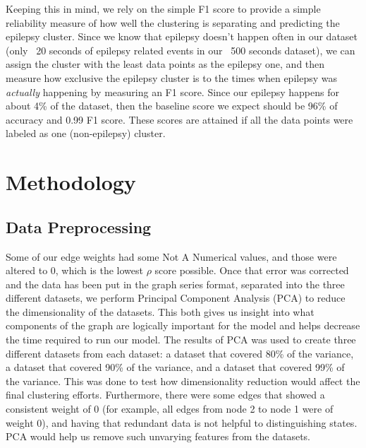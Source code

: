 \documentclass[journal,12pt,onecolumn,draftclsnofoot]{IEEEtran}  %
\begin{document}
Keeping this in mind, we rely on the simple F1 score to provide a simple reliability measure of how well the clustering is separating and predicting the epilepsy cluster. Since we know that epilepsy doesn't happen often in our dataset (only ~20 seconds  of epilepsy related events in our ~500 seconds dataset), we can assign the cluster with the least data points as the epilepsy one, and then measure how exclusive the epilepsy cluster is to the times when epilepsy was \textit{actually} happening by measuring an F1 score. Since our epilepsy happens for about 4\% of the dataset, then the baseline score we expect should be 96\% of accuracy and 0.99 F1 score. These scores are attained if all the data points were labeled as one (non-epilepsy) cluster.


\section{Methodology}


\subsection{Data Preprocessing}

Some of our edge weights had some Not A Numerical values, and those were altered to 0, which is the lowest $\rho$ score possible. Once that error was corrected and the data has been put in the graph series format, separated into the three different datasets, we perform Principal Component Analysis (PCA) to reduce the dimensionality of the datasets. This both gives us insight into what components of the graph are logically important for the model and helps decrease the time required to run our model. The results of PCA was used to create three different datasets from each dataset: a dataset that covered 80\% of the variance, a dataset that covered 90\% of the variance, and a dataset that covered 99\% of the variance. This was done to test how dimensionality reduction would affect the final clustering efforts. Furthermore, there were some edges that showed a consistent weight of 0 (for example, all edges from node 2 to node 1 were of weight 0), and having that redundant data is not helpful to distinguishing states. PCA would help us remove such unvarying features from the datasets.
\end{document}
